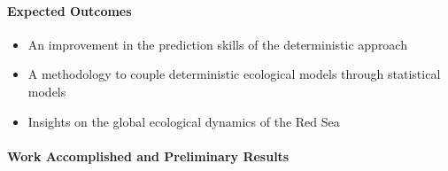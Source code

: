 \paragraph{Expected Outcomes}

\begin{itemize}
  \item An improvement in the prediction skills of the deterministic approach
  \item A methodology to couple deterministic ecological models through statistical models
  \item Insights on the global ecological dynamics of the Red Sea
\end{itemize}

\paragraph{Work Accomplished and Preliminary Results}

